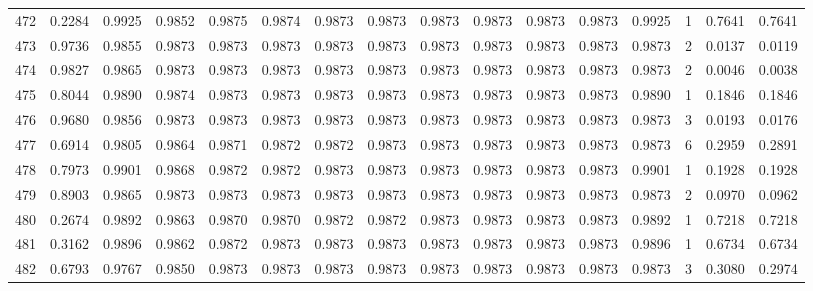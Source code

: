 \begin{tabular}{lrrrrrrrrrrrrrrr}
472 &      0.2284 &  0.9925 &  0.9852 &  0.9875 &  0.9874 &  0.9873 &  0.9873 &  0.9873 &  0.9873 &  0.9873 &   0.9873 &     0.9925 &      1 &                    0.7641 &                     0.7641 \\
473 &      0.9736 &  0.9855 &  0.9873 &  0.9873 &  0.9873 &  0.9873 &  0.9873 &  0.9873 &  0.9873 &  0.9873 &   0.9873 &     0.9873 &      2 &                    0.0137 &                     0.0119 \\
474 &      0.9827 &  0.9865 &  0.9873 &  0.9873 &  0.9873 &  0.9873 &  0.9873 &  0.9873 &  0.9873 &  0.9873 &   0.9873 &     0.9873 &      2 &                    0.0046 &                     0.0038 \\
475 &      0.8044 &  0.9890 &  0.9874 &  0.9873 &  0.9873 &  0.9873 &  0.9873 &  0.9873 &  0.9873 &  0.9873 &   0.9873 &     0.9890 &      1 &                    0.1846 &                     0.1846 \\
476 &      0.9680 &  0.9856 &  0.9873 &  0.9873 &  0.9873 &  0.9873 &  0.9873 &  0.9873 &  0.9873 &  0.9873 &   0.9873 &     0.9873 &      3 &                    0.0193 &                     0.0176 \\
477 &      0.6914 &  0.9805 &  0.9864 &  0.9871 &  0.9872 &  0.9872 &  0.9873 &  0.9873 &  0.9873 &  0.9873 &   0.9873 &     0.9873 &      6 &                    0.2959 &                     0.2891 \\
478 &      0.7973 &  0.9901 &  0.9868 &  0.9872 &  0.9872 &  0.9873 &  0.9873 &  0.9873 &  0.9873 &  0.9873 &   0.9873 &     0.9901 &      1 &                    0.1928 &                     0.1928 \\
479 &      0.8903 &  0.9865 &  0.9873 &  0.9873 &  0.9873 &  0.9873 &  0.9873 &  0.9873 &  0.9873 &  0.9873 &   0.9873 &     0.9873 &      2 &                    0.0970 &                     0.0962 \\
480 &      0.2674 &  0.9892 &  0.9863 &  0.9870 &  0.9870 &  0.9872 &  0.9872 &  0.9873 &  0.9873 &  0.9873 &   0.9873 &     0.9892 &      1 &                    0.7218 &                     0.7218 \\
481 &      0.3162 &  0.9896 &  0.9862 &  0.9872 &  0.9873 &  0.9873 &  0.9873 &  0.9873 &  0.9873 &  0.9873 &   0.9873 &     0.9896 &      1 &                    0.6734 &                     0.6734 \\
482 &      0.6793 &  0.9767 &  0.9850 &  0.9873 &  0.9873 &  0.9873 &  0.9873 &  0.9873 &  0.9873 &  0.9873 &   0.9873 &     0.9873 &      3 &                    0.3080 &                     0.2974 \\

\end{tabular}
